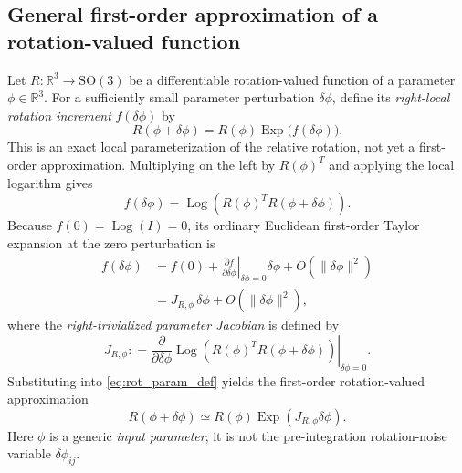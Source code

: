 \documentclass[11pt,a4paper]{article}
\newcommand{\Exp}{\operatorname{Exp}}
\newcommand{\Log}{\operatorname{Log}}
\newcommand{\SO}{\mathrm{SO}}
\newcommand{\R}{\mathbb{R}}
\newcommand{\defeq}{\mathrel{\mathop:}=}
\begin{document}
\subsection{General first-order approximation of a rotation-valued function}
Let $R:\R^3\to\SO(3)$ be a differentiable rotation-valued function
of a parameter $\phi\in\R^3$. For a sufficiently small parameter
perturbation $\delta\phi$, define its \emph{right-local rotation increment}
$f(\delta\phi)$ by
\begin{equation}\label{eq:rot_param_def}
\boxed{R(\phi+\delta\phi)=R(\phi)\Exp\bigl(f(\delta\phi)\bigr).}
\end{equation}
This is an exact local parameterization of the relative rotation, not
yet a first-order approximation. Multiplying on the left by $R(\phi)^T$
and applying the local logarithm gives
\begin{equation}\label{eq:rot_param_f}
\boxed{f(\delta\phi)=\Log\!\left(R(\phi)^T R(\phi+\delta\phi)\right).}
\end{equation}
Because $f(0)=\Log(I)=0$, its ordinary Euclidean first-order Taylor
expansion at the zero perturbation is
\begin{equation}
\begin{aligned}
f(\delta\phi)
&=f(0)+\left.\frac{\partial f}{\partial\delta\phi}\right|_{\delta\phi=0}
\delta\phi+O(\|\delta\phi\|^2)\\
&=J_{R,\phi}\,\delta\phi+O(\|\delta\phi\|^2),
\end{aligned}
\end{equation}
where the \emph{right-trivialized parameter Jacobian} is defined by
\begin{equation}\label{eq:rot_param_J}
\boxed{J_{R,\phi}\defeq
\left.\frac{\partial}{\partial\delta\phi}
\Log\!\left(R(\phi)^T R(\phi+\delta\phi)\right)
\right|_{\delta\phi=0}.}
\end{equation}
Substituting into \eqref{eq:rot_param_def} yields the first-order
rotation-valued approximation
\begin{equation}\label{eq:rot_param_linear}
\boxed{R(\phi+\delta\phi)\simeq
R(\phi)\Exp(J_{R,\phi}\delta\phi).}
\end{equation}
Here $\phi$ is a generic \emph{input parameter}; it is not the
pre-integration rotation-noise variable $\delta\phi_{ij}$.
\end{document}
